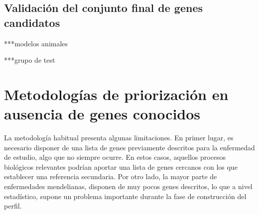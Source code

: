 \medskip




\subsection{Validación del conjunto final de genes candidatos}

***modelos animales


***grupo de test


\section{Metodologías de priorización en ausencia de genes conocidos}


\medskip
La metodología habitual presenta algunas limitaciones. En primer lugar, es necesario disponer de una lista de genes previamente descritos para la enfermedad de estudio, algo que no siempre ocurre. En estos casos, aquellos procesos biológicos relevantes podrían aportar una lista de genes cercanos con los que establecer una referencia secundaria. Por otro lado, la mayor parte de enfermedades mendelianas, disponen de muy pocos genes descritos, lo que a nivel estadístico, supone un problema importante durante la fase de construcción del perfil.


